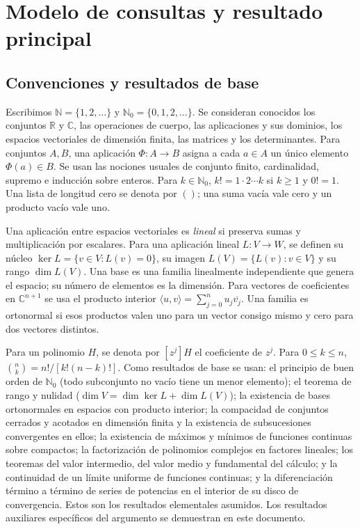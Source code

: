 \documentclass[11pt,a4paper]{article}
\numberwithin{equation}{section}
\theoremstyle{definition}
\theoremstyle{remark}
\newcommand{\R}{\mathbb R}
\newcommand{\C}{\mathbb C}
\newcommand{\N}{\mathbb N}
\newcommand{\Nn}{\mathbb N_0}
\begin{document}
\section{Modelo de consultas y resultado principal}\label{sec:model}

\subsection{Convenciones y resultados de base}
Escribimos $\N=\{1,2,\ldots\}$ y $\Nn=\{0,1,2,\ldots\}$. Se consideran conocidos los conjuntos $\R$ y $\C$, las operaciones de cuerpo, las aplicaciones y sus dominios, los espacios vectoriales de dimensión finita, las matrices y los determinantes. Para conjuntos $A,B$, una aplicación $\Phi:A\to B$ asigna a cada $a\in A$ un único elemento $\Phi(a)\in B$. Se usan las nociones usuales de conjunto finito, cardinalidad, supremo e inducción sobre enteros. Para $k\in\Nn$, $k!=1\cdot2\cdots k$ si $k\ge1$ y $0!=1$. Una lista de longitud cero se denota por $()$; una suma vacía vale cero y un producto vacío vale uno.

Una aplicación entre espacios vectoriales es \emph{lineal} si preserva sumas y multiplicación por escalares. Para una aplicación lineal $L:V\to W$, se definen su núcleo $\ker L=\{v\in V:L(v)=0\}$, su imagen $L(V)=\{L(v):v\in V\}$ y su rango $\dim L(V)$. Una base es una familia linealmente independiente que genera el espacio; su número de elementos es la dimensión. Para vectores de coeficientes en $\C^{n+1}$ se usa el producto interior $\langle u,v\rangle=\sum_{j=0}^n u_j\overline{v_j}$. Una familia es ortonormal si esos productos valen uno para un vector consigo mismo y cero para dos vectores distintos.

Para un polinomio $H$, se denota por $[z^j]H$ el coeficiente de $z^j$. Para $0\le k\le n$, $\binom nk=n!/[k!(n-k)!]$. Como resultados de base se usan: el principio de buen orden de $\Nn$ (todo subconjunto no vacío tiene un menor elemento); el teorema de rango y nulidad ($\dim V=\dim\ker L+\dim L(V)$); la existencia de bases ortonormales en espacios con producto interior; la compacidad de conjuntos cerrados y acotados en dimensión finita y la existencia de subsucesiones convergentes en ellos; la existencia de máximos y mínimos de funciones continuas sobre compactos; la factorización de polinomios complejos en factores lineales; los teoremas del valor intermedio, del valor medio y fundamental del cálculo; y la continuidad de un límite uniforme de funciones continuas; y la diferenciación término a término de series de potencias en el interior de su disco de convergencia. Estos son los resultados elementales asumidos. Los resultados auxiliares específicos del argumento se demuestran en este documento.
\end{document}
